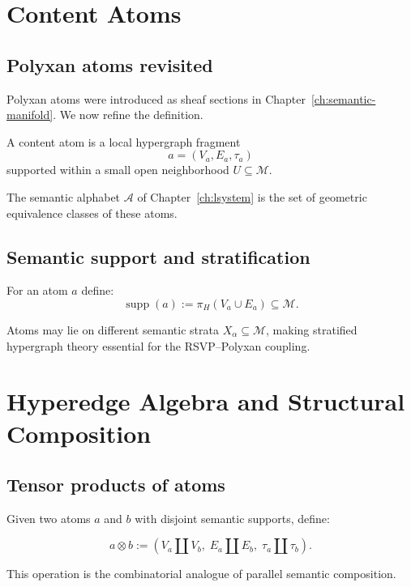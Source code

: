 \section{Content Atoms}

\subsection{Polyxan atoms revisited}

Polyxan atoms were introduced as sheaf sections in
Chapter~\ref{ch:semantic-manifold}. We now refine the definition.

\begin{definition}
A content atom is a local hypergraph fragment
\[
a = (V_a, E_a, \tau_a)
\]
supported within a small open neighborhood $U\subseteq\mathcal{M}$.
\end{definition}

The semantic alphabet $\mathcal{A}$ of Chapter~\ref{ch:lsystem} is the set of
geometric equivalence classes of these atoms.

\subsection{Semantic support and stratification}

For an atom $a$ define:
\[
\operatorname{supp}(a) := \pi_H(V_a \cup E_a) \subseteq \mathcal{M}.
\]

Atoms may lie on different semantic strata
$X_\alpha \subseteq\mathcal{M}$, making stratified hypergraph theory essential
for the RSVP--Polyxan coupling.

\section{Hyperedge Algebra and Structural Composition}

\subsection{Tensor products of atoms}

Given two atoms $a$ and $b$ with disjoint semantic supports, define:

\begin{definition}
\[
a \otimes b := (V_a\amalg V_b,\; E_a\amalg E_b,\;\tau_a\amalg\tau_b).
\]
\end{definition}

This operation is the combinatorial analogue of parallel semantic composition.

